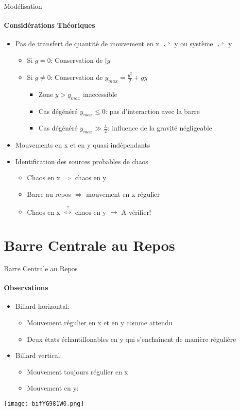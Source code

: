 \documentclass{beamer}
\begin{document}
  \begin{frame}{Modélisation}
  \framesubtitle{Considérations Théoriques}
  \begin{itemize}
    \item Pas de transfert de quantité de mouvement en x \(\rightleftharpoons\) y ou système \(\rightleftharpoons\) y
     \begin{itemize}
       \item Si \(g=0\): Conservation de \(\lvert \dot{y} \rvert\)
       \item Si \(g\neq0\): Conservation de \(y_{max}=\frac{\dot{y}^2}{2}+gy\)
       \begin{itemize}
         \item Zone \(y>y_{max}\) inaccessible
         \pause \item Cas dégénéré \(y_{max} \leq 0\): pas d'interaction avec la barre
         \item Cas dégénéré \(y_{max} \gg \frac{L}{2}\): influence de la gravité négligeable
       \end{itemize}
     \end{itemize}
    \pause \item Mouvements en x et en y quasi indépendants
    \item Identification des sources probables de chaos
    \begin{itemize}
      \pause \item Chaos en x \(\Rightarrow\) chaos en y
      \item Barre au repos \(\Rightarrow\) mouvement en x régulier
      \pause \item Chaos en x \(\overset{?}{\Leftrightarrow}\) chaos en y \(\rightarrow\) A vérifier!
    \end{itemize}
  \end{itemize}
  \end{frame}
  
  \section{Barre Centrale au Repos}
  
  \begin{frame}{Barre Centrale au Repos}
  \framesubtitle{Observations}
  \begin{itemize}
    \item Billard horizontal:
    \begin{itemize}
      \item Mouvement régulier en x et en y comme attendu
      \item Deux états échantillonables en y qui s'enchaînent de manière régulière
    \end{itemize}
    \pause \item Billard vertical:
    \begin{itemize}
      \item Mouvement toujours régulier en x
      \item Mouvement en y:
    \end{itemize}
  \end{itemize}
  \pause \texttt{[image: bifYG981W0.png]}
  \end{frame}
  
\end{document}
